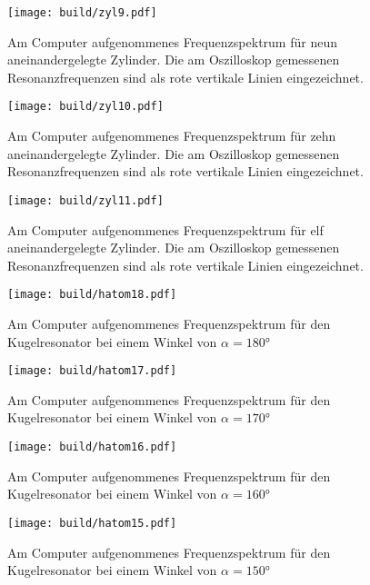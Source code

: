 \begin{figure}
  \centering
  \texttt{[image: build/zyl9.pdf]}
  \caption{Am Computer aufgenommenes Frequenzspektrum für neun aneinandergelegte
  Zylinder. Die am Oszilloskop gemessenen Resonanzfrequenzen sind als rote vertikale
  Linien eingezeichnet.}
  \label{fig:zyl9}
\end{figure}

\begin{figure}
  \centering
  \texttt{[image: build/zyl10.pdf]}
  \caption{Am Computer aufgenommenes Frequenzspektrum für zehn aneinandergelegte
  Zylinder. Die am Oszilloskop gemessenen Resonanzfrequenzen sind als rote vertikale
  Linien eingezeichnet.}
  \label{fig:zyl10}
\end{figure}

\begin{figure}
  \centering
  \texttt{[image: build/zyl11.pdf]}
  \caption{Am Computer aufgenommenes Frequenzspektrum für elf aneinandergelegte
  Zylinder. Die am Oszilloskop gemessenen Resonanzfrequenzen sind als rote vertikale
  Linien eingezeichnet.}
  \label{fig:zyl11}
\end{figure}

\begin{figure}
  \centering
  \texttt{[image: build/hatom18.pdf]}
  \caption{Am Computer aufgenommenes Frequenzspektrum für den Kugelresonator bei
  einem Winkel von $\alpha=180°$}
  \label{fig:hatom18}
\end{figure}

\begin{figure}
  \centering
  \texttt{[image: build/hatom17.pdf]}
  \caption{Am Computer aufgenommenes Frequenzspektrum für den Kugelresonator bei
  einem Winkel von $\alpha=170°$}
  \label{fig:hatom17}
\end{figure}

\begin{figure}
  \centering
  \texttt{[image: build/hatom16.pdf]}
  \caption{Am Computer aufgenommenes Frequenzspektrum für den Kugelresonator bei
  einem Winkel von $\alpha=160°$}
  \label{fig:hatom16}
\end{figure}

\begin{figure}
  \centering
  \texttt{[image: build/hatom15.pdf]}
  \caption{Am Computer aufgenommenes Frequenzspektrum für den Kugelresonator bei
  einem Winkel von $\alpha=150°$}
  \label{fig:hatom15}
\end{figure}

